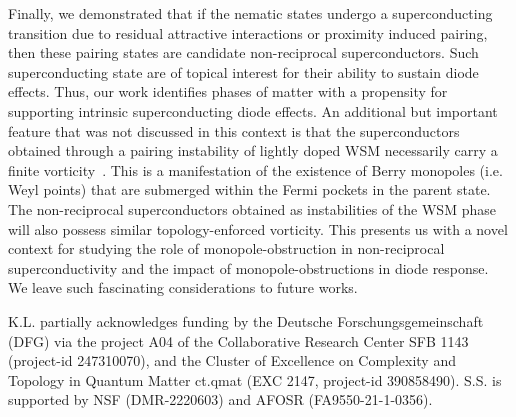 \documentclass[reprint,floatfix, twocolumn]{revtex4-1}
\begin{document}
Finally, we demonstrated that if the nematic states undergo a superconducting transition due to residual attractive interactions or proximity induced pairing, then these pairing states are candidate non-reciprocal superconductors. 
Such superconducting state are of topical interest for their ability to sustain diode effects. 
Thus, our work identifies phases of matter with a propensity for supporting intrinsic superconducting diode effects. 
An additional but important feature that was not discussed in this context is that the superconductors obtained through a pairing instability of lightly doped WSM necessarily carry a finite vorticity~\cite{li2018topological}.
This is a manifestation of the existence of Berry monopoles (i.e. Weyl points) that are submerged within the Fermi pockets in the parent state.
The non-reciprocal superconductors obtained as instabilities of the WSM phase will also possess similar topology-enforced vorticity.
This presents us with a novel context for studying the role of monopole-obstruction in non-reciprocal superconductivity and the impact of monopole-obstructions in diode response.
We leave such fascinating considerations to future works. 



\acknowledgements K.L. partially acknowledges funding by the Deutsche
Forschungsgemeinschaft (DFG) via the project A04 of the Collaborative Research
Center SFB 1143 (project-id 247310070), and the Cluster of
Excellence on Complexity and Topology in Quantum Matter
ct.qmat (EXC 2147, project-id 390858490). S.S. is supported by NSF (DMR-2220603) and AFOSR (FA9550-21-1-0356).


\renewcommand{\emph}{\textit}



\clearpage


\appendix

\onecolumngrid 
\end{document}
